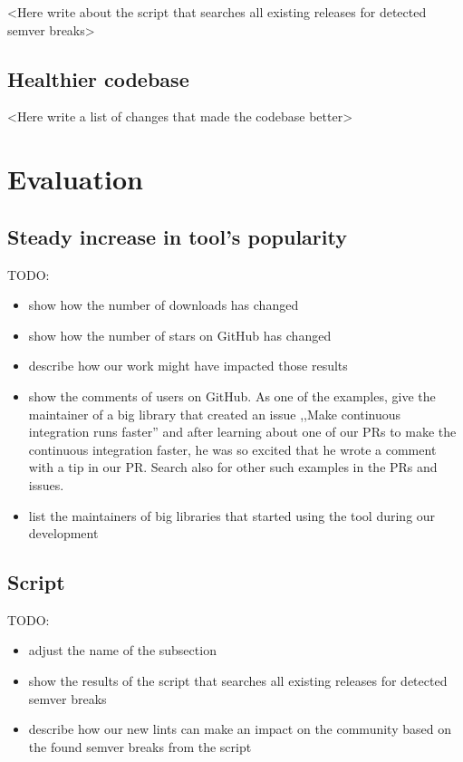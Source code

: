 \documentclass[licencjacka,en]{pracamgr}
\begin{document}
<Here write about the script that searches all existing releases for detected semver breaks>

\section{Healthier codebase}

<Here write a list of changes that made the codebase better>

\chapter{Evaluation}\label{r:chapter_evaluation}

\section{Steady increase in tool's popularity}

TODO:
\begin{itemize}
	\item show how the number of downloads has changed
	\item show how the number of stars on GitHub has changed
	\item describe how our work might have impacted those results
	\item show the comments of users on GitHub.
		As one of the examples, give the maintainer of a big
		library that created an issue ,,Make continuous integration runs faster''
		and after learning about one of our PRs to make the continuous integration faster,
		he was so excited that he wrote a comment with a tip in our PR.
		Search also for other such examples in the PRs and issues.
	\item list the maintainers of big libraries that started using the tool during our development
\end{itemize}

\section{Script} \label{r:section_scanning_script}

TODO:
\begin{itemize}
        \item adjust the name of the subsection
        \item show the results of the script that searches all existing releases for detected semver breaks
	\item describe how our new lints can make an impact on the community based on the found semver breaks from the script
\end{itemize}
\end{document}
